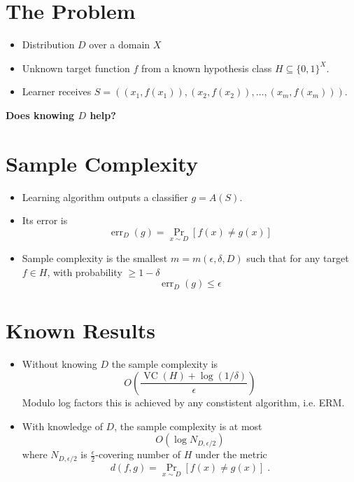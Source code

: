 \documentclass[30pt,landscape]{sciposter}
\DeclareMathOperator{\err}{err}
\DeclareMathOperator{\VC}{VC}
\begin{document}
\setlength{\parindent}{0em}
\setlength{\columnsep}{4cm}
\begin{multicols}{3}

\section*{The Problem}

\begin{itemize}
\item Distribution $D$ over a domain $X$
\item Unknown target function $f$ from a known hypothesis class $H \subseteq \{0,1\}^X$.
\item Learner receives $S = ((x_1, f(x_1)), (x_2, f(x_2)), \dots, (x_m, f(x_m)))$.
\end{itemize}

\vspace{1cm}

\textbf{Does knowing $D$ help?}

\section*{Sample Complexity}

\begin{itemize}
\item Learning algorithm outputs a classifier $g=A(S)$.
\item Its error is
$$
\err_D(g) = \Pr_{x \sim D}[f(x)\neq g(x)]
$$
\item Sample complexity is the smallest $m = m(\epsilon,\delta,D)$ such that for any target $f \in H$,
with probability $\ge 1 - \delta$
$$
\err_D(g) \le \epsilon
$$
\end{itemize}

\section*{Known Results}

\begin{itemize}
\item Without knowing $D$ the sample complexity is
$$
O \left( \frac{\VC(H) + \log(1/\delta)}{\epsilon} \right)
$$
Modulo log factors this is achieved by any constistent algorithm, i.e. ERM.

\vspace{1cm}

\item With knowledge of $D$, the sample complexity is at most
$$
O(\log N_{D,\epsilon/2})
$$
where $N_{D,\epsilon/2}$ is $\frac{\epsilon}{2}$-covering number
of $H$ under the metric
$$
d(f,g) = \Pr_{x \sim D}[f(x) \neq g(x)] \; .
$$


\end{itemize}
\end{multicols}
\end{document}
